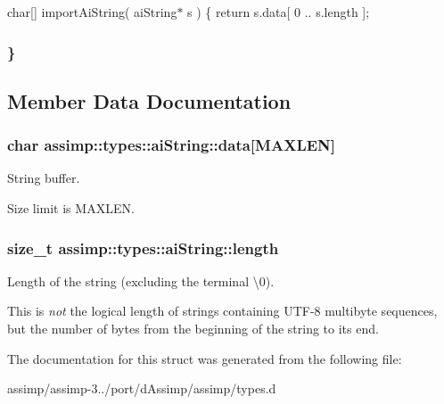 char\mbox{[}\mbox{]} import\+Ai\+String( ai\+String$\ast$ s ) \{ return s.\+data\mbox{[} 0 .. s.\+length \mbox{]}; \subsubsection*{\} }

\subsection{Member Data Documentation}
\hypertarget{structassimp_1_1types_1_1ai_string_afe06048e3e72c3b60edb4810c145d2da}{
\subsubsection[{data}]{\setlength{\rightskip}{0pt plus 5cm}char assimp\+::types\+::ai\+String\+::data\mbox{[}{\bf M\+A\+X\+L\+E\+N}\mbox{]}}}\label{structassimp_1_1types_1_1ai_string_afe06048e3e72c3b60edb4810c145d2da}
String buffer.

Size limit is {\ttfamily M\+A\+X\+L\+E\+N}. \hypertarget{structassimp_1_1types_1_1ai_string_ae92dc7402798c16a0543f9a9fc7ea2ac}{
\subsubsection[{length}]{\setlength{\rightskip}{0pt plus 5cm}size\+\_\+t assimp\+::types\+::ai\+String\+::length}}\label{structassimp_1_1types_1_1ai_string_ae92dc7402798c16a0543f9a9fc7ea2ac}
Length of the string (excluding the terminal \textbackslash{}0).

This is {\itshape not} the logical length of strings containing U\+T\+F-\/8 multibyte sequences, but the number of bytes from the beginning of the string to its end. 

The documentation for this struct was generated from the following file\+:\begin{DoxyCompactItemize}
\item 
assimp/assimp-\/3../port/d\+Assimp/assimp/types.\+d\end{DoxyCompactItemize}
